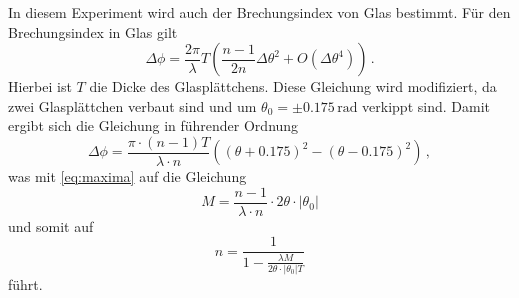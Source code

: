 In diesem Experiment wird auch der Brechungsindex von Glas bestimmt. Für den Brechungsindex in Glas gilt
\begin{equation}\label{eq:phiglas}
    \Delta \phi = \frac{2\pi}{\lambda}T\left(\frac{n-1}{2n}\Delta \theta^2+O( \Delta \theta^4)\right) \, .
\end{equation}
Hierbei ist $T$ die Dicke des Glasplättchens.
Diese Gleichung wird modifiziert, da zwei Glasplättchen verbaut sind und um $\theta_0 = \pm 0.175\,\text{rad}$ verkippt sind. Damit ergibt sich die Gleichung in führender Ordnung
\begin{equation}
    \Delta \phi = \frac{\pi \cdot (n - 1) T}{\lambda \cdot n} \left(\left( \theta + 0.175 \right)^2 - \left( \theta - 0.175 \right)^2\right) \, ,
\end{equation}
was mit \autoref{eq:maxima} auf die Gleichung
\begin{equation*}
    M = \frac{n - 1}{\lambda \cdot n} \cdot 2 \theta \cdot |\theta_0|
\end{equation*}
und somit auf
\begin{equation} \label{eq:n_Glas}
    n = \frac{1}{1- \frac{\lambda M}{ 2 \theta \cdot |\theta_0| T}}
\end{equation}
führt.